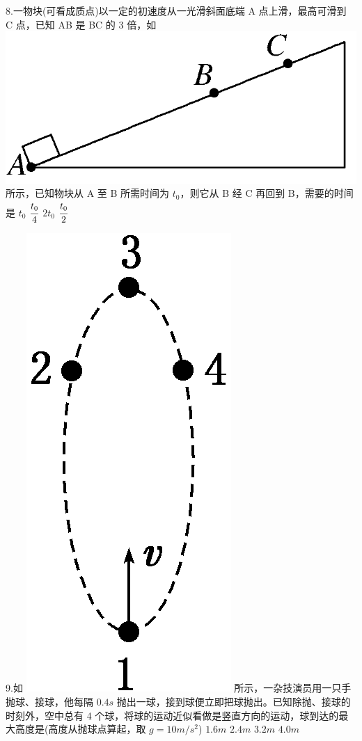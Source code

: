 \documentclass[a4paper,fontset = windows]{ctexbook} %
\begin{document}
\begin{xuanze}
8.一物块(可看成质点)以一定的初速度从一光滑斜面底端 A 点上滑，最高可滑到 C 点，已知 AB 是 BC 的 3 倍，如
\includegraphics{../picture/1-2/002.png}
所示，已知物块从 A 至 B 所需时间为 $t_0$，则它从 B 经 C 再回到 B，需要的时间是
\choice[A] $t_0$
\choice[B] $\cfrac{t_0}{4}$
\choice[C] $2t_0$
\choice[D] $\cfrac{t_0}{2}$

9.如
\includegraphics{../picture/1-2/003.png}
所示，一杂技演员用一只手抛球、接球，他每隔 $0.4s$ 抛出一球，接到球便立即把球抛出。已知除抛、接球的时刻外，空中总有 4 个球，将球的运动近似看做是竖直方向的运动，球到达的最大高度是(高度从抛球点算起，取 $g=10 m/s^2$)
\choice[A] $1.6m$
\choice[B] $2.4m$
\choice[C] $3.2m$
\choice[D] $4.0m$


\end{xuanze}
\end{document}
